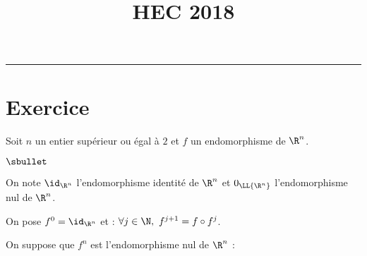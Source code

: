\documentclass[11pt]{article}%
\title{\bf \vspace{-1.6cm} HEC 2018} %
\author{} %
\date{} %
\begin{document}
\maketitle %
\vspace{-1.2cm}\hrule %
\thispagestyle{fancy}

\vspace*{.4cm}


\section*{Exercice}

\noindent
Soit $n$ un entier supérieur ou égal à $2$ et $f$ un endomorphisme de
$\R^n$.
\begin{noliste}{$\sbullet$}
\item On note $\id_{\R^n}$ l'endomorphisme identité de $\R^n$ et
  $0_{\LL{\R^n}}$ l'endomorphisme nul de $\R^n$.

\item On pose $f^0=\id_{\R^n}$ et : $\forall j \in \N, \ f^{j+1}=f
  \circ f^j$.
  
\item On suppose que $f^n$ est l'endomorphisme nul de $\R^n$ : \
\end{noliste}
\end{document}
